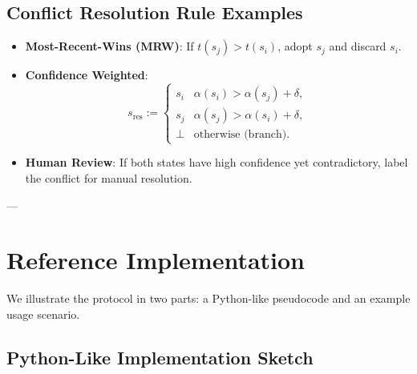 \documentclass{article}
\begin{document}
\subsection{Conflict Resolution Rule Examples}
\begin{itemize}
    \item \textbf{Most-Recent-Wins (MRW)}: If $t(s_j) > t(s_i)$, adopt $s_j$ and discard $s_i$.  
    \item \textbf{Confidence Weighted}:
    \[
       s_{\mathrm{res}} := \begin{cases}
         s_i & \alpha(s_i) > \alpha(s_j) + \delta,\\
         s_j & \alpha(s_j) > \alpha(s_i) + \delta,\\
         \bot & \text{otherwise (branch)}.
       \end{cases}
    \]
    \item \textbf{Human Review}: If both states have high confidence yet contradictory, label the conflict for manual resolution.
\end{itemize}

---

\section{Reference Implementation}

We illustrate the protocol in two parts: a Python-like pseudocode and an example usage scenario.

\subsection{Python-Like Implementation Sketch}
\end{document}
